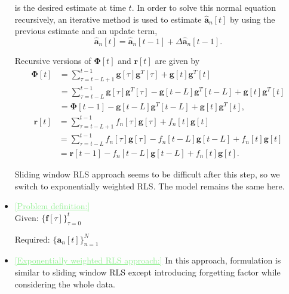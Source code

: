 \documentclass[11pt,final,onecolumn]{IEEEtran}
\newcommand{\cmt}[1]{\noindent\textcolor{lightgreen}{\underline{[#1]}}} %
\newcommand{\cmt}[1]{} %
\begin{document}
\begin{itemize}
 is the desired estimate at time $t$. In order to solve this normal equation recursively, an iterative method is used to estimate $\hat {\bm a}_n[t]$ by using the previous estimate and an update term,
\begin{equation}\label{key}
\hat {\bm a}_n[t]=\hat {\bm a}_n[t-1]+ \Delta \hat {\bm a}_n[t-1].
\end{equation}

 Recursive versions of $\bm\Phi[t]$ and $\bm r[t] $ are given by 
\begin{align}\label{eq32}
\bm\Phi [t]&=\sum_{\tau=t-L+1}^{t-1}\bm g[\tau]\bm g^T[\tau]+\bm g[t]\bm g^T[t]\\
&=\sum_{\tau=t-L}^{t-1}\bm g[\tau]\bm g^T[\tau]-\bm g[t-L]\bm g^T[t-L]+\bm g[t]\bm g^T[t]\\
&=\bm \Phi [t-1]-\bm g[t-L]\bm g^T[t-L] + \bm g[t]\bm g^T[t],
\end{align}
\begin{align}
\bm r[t]&=\sum_{\tau=t-L+1}^{t-1} f_n[\tau]\bm g[\tau]+f_n[t]\bm g[t]\\
&=\sum_{\tau=t-L}^{t-1} f_n[\tau]\bm g[\tau]-f_n[t-L]\bm g[t-L]+f_n[t]\bm g[t]\\
&=\bm r[t-1]-f_n[t-L]\bm g[t-L] + f_n[t]\bm g[t].
\end{align}


Sliding window RLS approach seems to be difficult after this step, so we switch to exponentially weighted RLS. The model remains the same here.
\item \cmt {Problem definition:}\\
Given: $\{\bm f[\tau]\}_{\tau =0}^{t}$

Required: $\{ \bm a_n[t]\}_{n=1}^N$   
\item \cmt{Exponentially weighted RLS approach:} In this approach, formulation is similar to sliding window RLS except introducing forgetting factor while considering the whole data.


\end{itemize}
\end{document}
